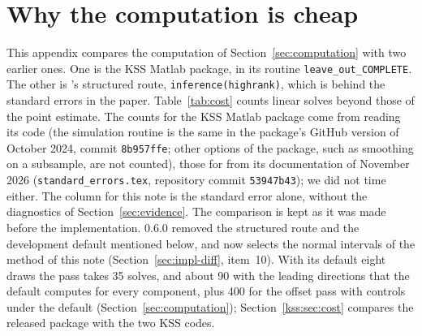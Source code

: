 \section{Why the computation is cheap}\label{app:cost}

This appendix compares the computation of Section~\ref{sec:computation} with two earlier ones. One is the KSS
Matlab package, in its routine \texttt{leave\_out\_COMPLETE}. The other is \fevc's structured route,
\texttt{inference(highrank)}, which is behind the standard errors in the \fevc{} paper. Table~\ref{tab:cost} counts linear solves beyond those of
the point estimate. The counts for the KSS Matlab package come from reading its code (the simulation routine
is the same in the package's GitHub version of October 2024, commit \texttt{8b957ffe}; other options of the
package, such as smoothing on a subsample, are not counted), those for \fevc{} from its documentation of November
2026 (\texttt{standard\_errors.tex}, repository commit \texttt{53947b43}); we did not time either. The column for
this note is the standard error alone, without the diagnostics of Section~\ref{sec:evidence}. The comparison is
kept as it was made before the implementation. \fevc{} 0.6.0 removed the structured route and the development
default mentioned below, and  now selects the normal intervals of the method of this note
(Section~\ref{sec:impl-diff}, item~10). With its default eight draws the pass takes 35 solves, and about 90 with
the leading directions that the default computes for every component, plus 400 for the offset pass with controls
under the default  (Section~\ref{sec:computation});
Section~\ref{kss:sec:cost} compares the released package with the two KSS codes.

